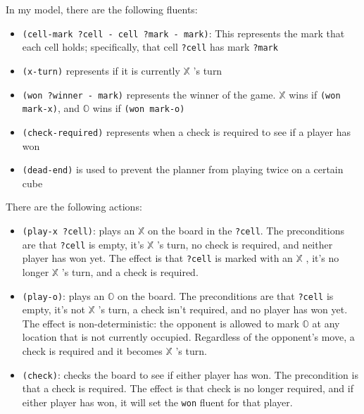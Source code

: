 \documentclass[11pt]{article}
\newcommand{\XX}{$\mathbb{X}$ }
\newcommand{\OO}{$\mathbb{O}$ }
\begin{document}
In my model, there are the following fluents:
\begin{itemize}
    \item \texttt{(cell-mark ?cell - cell ?mark - mark)}: This represents the mark that each cell holds; specifically, that cell \texttt{?cell} has mark \texttt{?mark}
    \item \texttt{(x-turn)} represents if it is currently \XX's turn
    \item \texttt{(won ?winner - mark)} represents the winner of the game. \XX wins if \texttt{(won mark-x)}, and \OO wins if \texttt{(won mark-o)} 
    \item \texttt{(check-required)} represents when a check is required to see if a player has won
    \item \texttt{(dead-end)} is used to prevent the planner from playing twice on a certain cube
\end{itemize}

There are the following actions:
\begin{itemize}
    \item \texttt{(play-x ?cell)}: plays an \XX on the board in the \texttt{?cell}. The preconditions are that \texttt{?cell} is empty, it's \XX's turn, no check is required, and neither player has won yet. The effect is that \texttt{?cell} is marked with an \XX, it's no longer \XX's turn, and a check is required.
    \item \texttt{(play-o)}: plays an \OO on the board. The preconditions are that \texttt{?cell} is empty, it's not \XX's turn, a check isn't required, and no player has won yet. The effect is non-deterministic: the opponent is allowed to mark \OO at any location that is not currently occupied. Regardless of the opponent's move, a check is required and it becomes \XX's turn.
    \item \texttt{(check)}: checks the board to see if either player has won. The precondition is that a check is required. The effect is that check is no longer required, and if either player has won, it will set the \texttt{won} fluent for that player.
\end{itemize}
\end{document}
